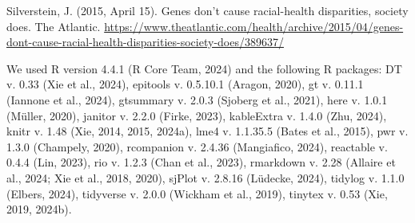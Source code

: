 \documentclass[
  letterpaper,
  DIV=11,
  numbers=noendperiod]{scrartcl}
\begin{document}
Silverstein, J. (2015, April 15). Genes don't cause racial-health
disparities, society does. The Atlantic.
\url{https://www.theatlantic.com/health/archive/2015/04/genes-dont-cause-racial-health-disparities-society-does/389637/}~

\newpage

We used R version 4.4.1 (R Core Team, 2024) and the following R
packages: DT v. 0.33 (Xie et al., 2024), epitools v. 0.5.10.1 (Aragon,
2020), gt v. 0.11.1 (Iannone et al., 2024), gtsummary v. 2.0.3 (Sjoberg
et al., 2021), here v. 1.0.1 (Müller, 2020), janitor v. 2.2.0 (Firke,
2023), kableExtra v. 1.4.0 (Zhu, 2024), knitr v. 1.48 (Xie, 2014, 2015,
2024a), lme4 v. 1.1.35.5 (Bates et al., 2015), pwr v. 1.3.0 (Champely,
2020), rcompanion v. 2.4.36 (Mangiafico, 2024), reactable v. 0.4.4 (Lin,
2023), rio v. 1.2.3 (Chan et al., 2023), rmarkdown v. 2.28 (Allaire et
al., 2024; Xie et al., 2018, 2020), sjPlot v. 2.8.16 (Lüdecke, 2024),
tidylog v. 1.1.0 (Elbers, 2024), tidyverse v. 2.0.0 (Wickham et al.,
2019), tinytex v. 0.53 (Xie, 2019, 2024b).
\end{document}
